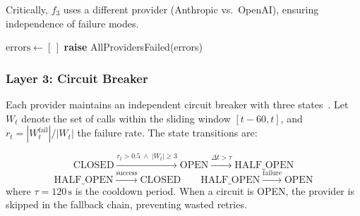 \documentclass[conference]{IEEEtran}
\begin{document}
Critically, $f_3$ uses a different provider (Anthropic vs.\ OpenAI), ensuring independence of failure modes.

\begin{algorithm}[htbp]
    \caption{Fallback Chain Execution}
    \label{alg:fallback}
    $\textrm{errors} \leftarrow [\,]$\;
    \textbf{raise} AllProvidersFailed(errors)\;
\end{algorithm}

\subsubsection{Layer 3: Circuit Breaker}

Each provider maintains an independent circuit breaker with three states~\cite{nygard2007release}. Let $W_t$ denote the set of calls within the sliding window $[t - 60, t]$, and $r_t = |W_t^{\textrm{fail}}| / |W_t|$ the failure rate. The state transitions are:

\begin{equation}
    \textrm{CLOSED} \xrightarrow{r_t > 0.5 \;\land\; |W_t| \geq 3} \textrm{OPEN} \xrightarrow{\Delta t > \tau} \textrm{HALF\_OPEN}
\end{equation}
\begin{equation}
    \textrm{HALF\_OPEN} \xrightarrow{\textrm{success}} \textrm{CLOSED} \qquad \textrm{HALF\_OPEN} \xrightarrow{\textrm{failure}} \textrm{OPEN}
\end{equation}
where $\tau = 120\,\textrm{s}$ is the cooldown period. When a circuit is OPEN, the provider is skipped in the fallback chain, preventing wasted retries.
\end{document}
